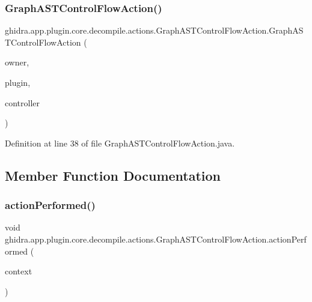 \subsubsection{\texorpdfstring{GraphASTControlFlowAction()}{GraphASTControlFlowAction()}}
{\footnotesize\ttfamily ghidra.\+app.\+plugin.\+core.\+decompile.\+actions.\+Graph\+A\+S\+T\+Control\+Flow\+Action.\+Graph\+A\+S\+T\+Control\+Flow\+Action (\begin{DoxyParamCaption}\item[{String}]{owner,  }\item[{Plugin}]{plugin,  }\item[{\mbox{\hyperlink{classghidra_1_1app_1_1decompiler_1_1component_1_1_decompiler_controller}{Decompiler\+Controller}}}]{controller }\end{DoxyParamCaption})\hspace{0.3cm}{\ttfamily [inline]}}



Definition at line 38 of file Graph\+A\+S\+T\+Control\+Flow\+Action.\+java.



\subsection{Member Function Documentation}
\mbox{\label{classghidra_1_1app_1_1plugin_1_1core_1_1decompile_1_1actions_1_1_graph_a_s_t_control_flow_action_ae1224abf771e50719a814edb0112c5bd}} 
\subsubsection{\texorpdfstring{actionPerformed()}{actionPerformed()}}
{\footnotesize\ttfamily void ghidra.\+app.\+plugin.\+core.\+decompile.\+actions.\+Graph\+A\+S\+T\+Control\+Flow\+Action.\+action\+Performed (\begin{DoxyParamCaption}\item[{Action\+Context}]{context }\end{DoxyParamCaption})\hspace{0.3cm}{\ttfamily [inline]}}



